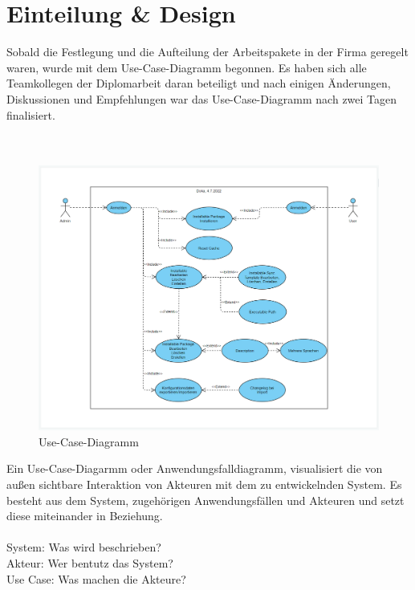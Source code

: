 \section{Einteilung \& Design}
Sobald die Festlegung und die Aufteilung der Arbeitspakete in der Firma geregelt waren, wurde mit dem Use-Case-Diagramm begonnen.
Es haben sich alle Teamkollegen der Diplomarbeit daran beteiligt und nach einigen Änderungen, Diskussionen und Empfehlungen 
war das Use-Case-Diagramm nach zwei Tagen finalisiert.
\\
\\
\\

\begin{figure}[ht!]
    \centering
    \includegraphics[scale=0.3]{pics/UCD.png}
    \caption{\label{fig:The-caption}Use-Case-Diagramm \cite{APCW2006}}
    \label{fig:impl:use-case-diagramm}
  \end{figure}
\newpage

  Ein Use-Case-Diagarmm oder Anwendungsfalldiagramm, visualisiert die von außen sichtbare 
  Interaktion von Akteuren mit dem zu entwickelnden System. Es besteht aus dem System,
  zugehörigen Anwendungsfällen und Akteuren und setzt diese miteinander in Beziehung.
  \\
  \\
  System: Was wird beschrieben?
  \\
  Akteur: Wer bentutz das System?
  \\
  Use Case: Was machen die Akteure?

